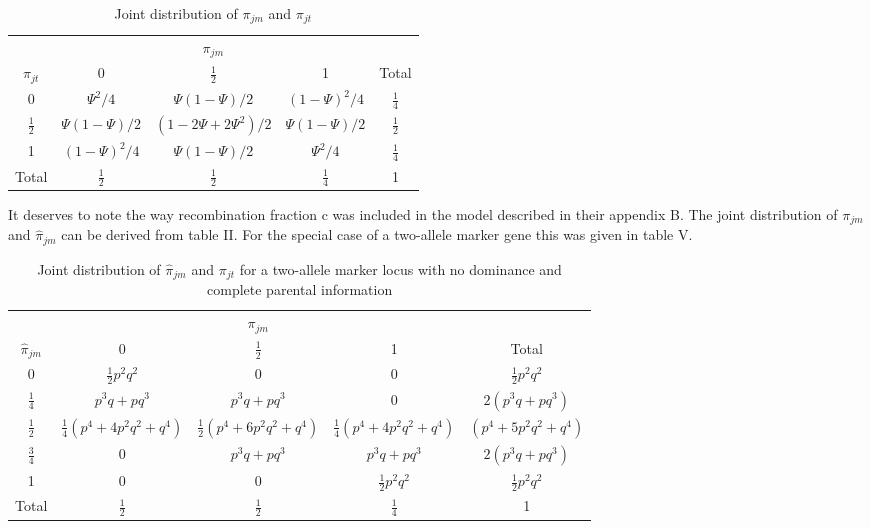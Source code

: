 \begin{table}[h]\centering
\caption{Joint distribution of $\pi_{jm}$ and $\pi_{jt}$\label{table4}}
\begin{tabular}{ccccc}
\hline
&\multicolumn{3}{c}{$\pi_{jm}$} \\ \cline{2-4}
$\pi_{jt}$&0 & $\frac{1}{2}$ & 1 & Total \\
\hline
0  & $\Psi^2/4$ & $\Psi(1-\Psi)/2$ & $(1-\Psi)^2/4$ & $\frac{1}{4}$\\
$\frac{1}{2}$ & $\Psi(1-\Psi)/2$ & $(1-2\Psi+2\Psi^2)/2$ & $\Psi(1-\Psi)/2$ & $\frac{1}{2}$ \\
1  & $(1-\Psi)^2/4$ & $\Psi(1-\Psi)/2$ & $\Psi^2/4$ & $\frac{1}{4}$ \\
Total &$\frac{1}{2}$& $\frac{1}{2}$& $\frac{1}{4}$& 1\\
\hline
\end{tabular}
\end{table}

  It deserves to note the way recombination fraction c was included
in the model described in their appendix B. The joint distribution of
$\pi_{jm}$ and $\hat\pi_{jm}$ can be derived from table II. For the
special case of a two-allele marker gene this was given in table V.

\begin{table}[h]\centering
\caption{Joint distribution of $\hat\pi_{jm}$ and $\pi_{jt}$ for a
two-allele marker locus with no dominance and complete parental
information \label{table5}}
\begin{tabular}{ccccc}
\hline
&\multicolumn{3}{c}{$\pi_{jm}$} \\ \cline{2-4}
$\hat\pi_{jm}$&0 & $\frac{1}{2}$ & 1 & Total \\
\hline
0  & $\frac{1}{2}p^2q^2$ & 0 & 0 & $\frac{1}{2}p^2q^2$\\
$\frac{1}{4}$ & $p^3q+pq^3$ & $p^3q+pq^3$ & 0 & $2(p^3q+pq^3)$ \\
$\frac{1}{2}$ & $\frac{1}{4}(p^4+4p^2q^2+q^4)$ & $\frac{1}{2}(p^4+6p^2q^2+q^4)$ &
$\frac{1}{4}(p^4+4p^2q^2+q^4)$ & $(p^4+5p^2q^2+q^4)$ \\
$\frac{3}{4}$ & 0 & $p^3q+pq^3$ & $p^3q+pq^3$ & $2(p^3q+pq^3)$ \\
1  & 0 & 0 & $\frac{1}{2}p^2q^2$ & $\frac{1}{2}p^2q^2$ \\
Total &$\frac{1}{2}$& $\frac{1}{2}$& $\frac{1}{4}$& 1\\
\hline
\end{tabular}
\end{table}

